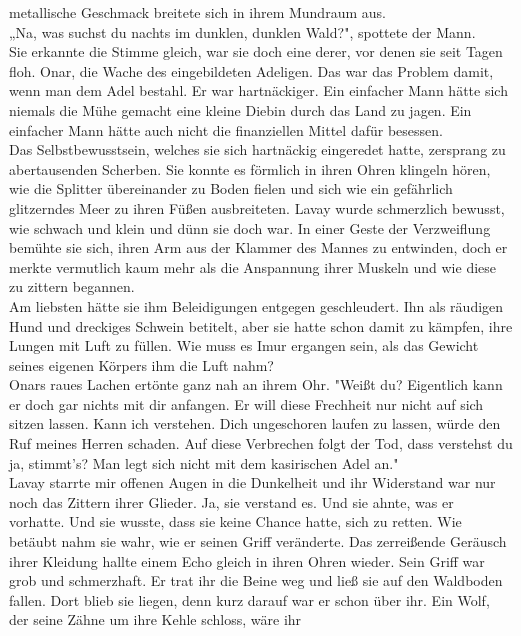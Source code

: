 metallische Geschmack breitete sich in ihrem Mundraum aus.\\
„Na, was suchst du nachts im dunklen, dunklen Wald?", spottete der Mann.\\
Sie erkannte die Stimme gleich, war sie doch eine derer, vor denen sie seit Tagen floh. Onar, die 
Wache des eingebildeten Adeligen. Das war das Problem damit, wenn man dem Adel bestahl. Er war 
hartnäckiger. Ein einfacher Mann hätte sich niemals die Mühe gemacht eine kleine Diebin durch das 
Land zu jagen. Ein einfacher Mann hätte auch nicht die finanziellen Mittel dafür besessen.\\
Das Selbstbewusstsein, welches sie sich hartnäckig eingeredet hatte, zersprang zu abertausenden 
Scherben. Sie konnte es förmlich in ihren Ohren klingeln hören, wie die Splitter übereinander zu 
Boden fielen und sich wie ein gefährlich glitzerndes Meer zu ihren Füßen ausbreiteten. Lavay wurde 
schmerzlich bewusst, wie schwach und klein und dünn sie doch war. In einer Geste der Verzweiflung 
bemühte sie sich, ihren Arm aus der Klammer des Mannes zu entwinden, doch er merkte vermutlich kaum 
mehr als die Anspannung ihrer Muskeln und wie diese zu zittern begannen.\\
Am liebsten hätte sie ihm Beleidigungen entgegen geschleudert. Ihn als räudigen Hund und dreckiges 
Schwein betitelt, aber sie hatte schon damit zu kämpfen, ihre Lungen mit Luft zu füllen. Wie muss 
es Imur ergangen sein, als das Gewicht seines eigenen Körpers ihm die Luft nahm?\\
Onars raues Lachen ertönte ganz nah an ihrem Ohr. "Weißt du? Eigentlich kann er doch gar nichts mit 
dir anfangen. Er will diese Frechheit nur nicht auf sich sitzen lassen. Kann ich verstehen. Dich 
ungeschoren laufen zu lassen, würde den Ruf meines Herren schaden. Auf diese Verbrechen folgt der 
Tod, dass verstehst du ja, stimmt's? Man legt sich nicht mit dem kasirischen Adel an."\\
Lavay starrte mir offenen Augen in die Dunkelheit und ihr Widerstand war nur noch das Zittern ihrer 
Glieder. Ja, sie verstand es. Und sie ahnte, was er vorhatte. Und sie wusste, dass sie keine Chance 
hatte, sich zu retten. Wie betäubt nahm sie wahr, wie er seinen Griff veränderte. Das zerreißende 
Geräusch ihrer Kleidung hallte einem Echo gleich in ihren Ohren wieder. Sein Griff war grob und 
schmerzhaft. Er trat ihr die Beine weg und ließ sie auf den Waldboden fallen. Dort blieb sie liegen, 
denn kurz darauf war er schon über ihr. Ein Wolf, der seine Zähne um ihre Kehle schloss, wäre ihr 
